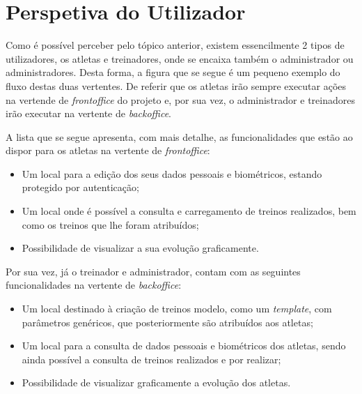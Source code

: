 \section{Perspetiva do Utilizador}

Como é possível perceber pelo tópico anterior, existem essencilmente 2 tipos de utilizadores, os atletas e treinadores, onde se encaixa também o administrador ou administradores. Desta forma, a figura que se segue é um pequeno exemplo do fluxo destas duas vertentes. De referir que os atletas irão sempre executar ações na vertende de \textit{frontoffice} do projeto e, por sua vez, o administrador e treinadores irão executar na vertente de \textit{backoffice}.


A lista que se segue apresenta, com mais detalhe, as funcionalidades que estão ao dispor para os atletas na vertente de \textit{frontoffice}:

\begin{itemize}
	\item Um local para a edição dos seus dados pessoais e biométricos, estando protegido por autenticação;
	\item Um local onde é possível a consulta e carregamento de treinos realizados, bem como os treinos que lhe foram atribuídos;
	\item Possibilidade de visualizar a sua evolução graficamente.
\end{itemize}

Por sua vez, já o treinador e administrador, contam com as seguintes funcionalidades na vertente de \textit{backoffice}:

\begin{itemize}
	\item Um local destinado à criação de treinos modelo, como um \textit{template}, com parâmetros genéricos, que posteriormente são atribuídos aos atletas;
	\item Um local para a consulta de dados pessoais e biométricos dos atletas, sendo ainda possível a consulta de treinos realizados e por realizar;
	\item Possibilidade de visualizar graficamente a evolução dos atletas.
\end{itemize}